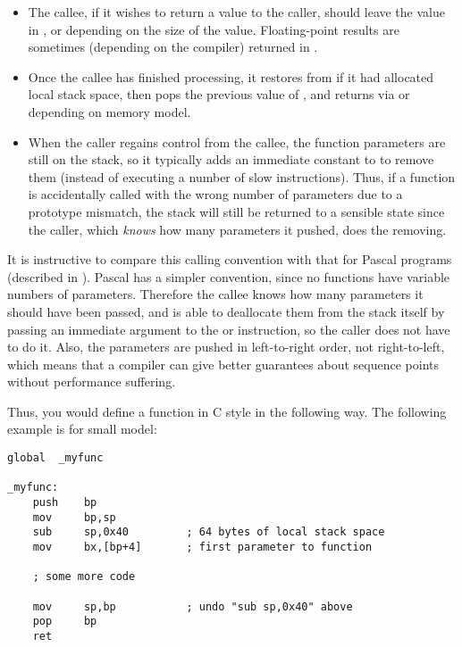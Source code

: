 \begin{itemize}
    \item{The callee, if it wishes to return a value to the caller, should
        leave the value in ,  or  depending
        on the size of the value. Floating-point results are sometimes
        (depending on the compiler) returned in .}

    \item{Once the callee has finished processing, it restores  from
         if it had allocated local stack space, then pops the previous
        value of , and returns via  or  depending on
        memory model.}

    \item{When the caller regains control from the callee, the function
        parameters are still on the stack, so it typically adds an immediate
        constant to  to remove them (instead of executing a number of
        slow  instructions). Thus, if a function is accidentally
        called with the wrong number of parameters due to a prototype
        mismatch, the stack will still be returned to a sensible state since
        the caller, which \emph{knows} how many parameters it pushed, does the
        removing.}
\end{itemize}

It is instructive to compare this calling convention with that for
Pascal programs (described in ). Pascal has
a simpler convention, since no functions have variable numbers of parameters.
Therefore the callee knows how many parameters it should have been
passed, and is able to deallocate them from the stack itself by
passing an immediate argument to the  or 
instruction, so the caller does not have to do it. Also, the
parameters are pushed in left-to-right order, not right-to-left,
which means that a compiler can give better guarantees about
sequence points without performance suffering.

Thus, you would define a function in C style in the following way.
The following example is for small model:

\begin{lstlisting}
global  _myfunc

_myfunc:
    push    bp
    mov     bp,sp
    sub     sp,0x40         ; 64 bytes of local stack space
    mov     bx,[bp+4]       ; first parameter to function

    ; some more code

    mov     sp,bp           ; undo "sub sp,0x40" above
    pop     bp
    ret
\end{lstlisting}

